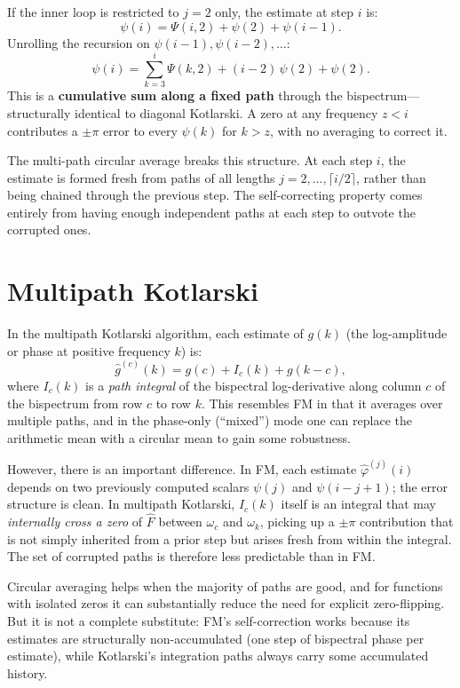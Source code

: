 \documentclass[11pt]{article}
\newcommand{\Fhat}{\hat{F}}
\begin{document}
If the inner loop is restricted to $j = 2$ only, the estimate at step
$i$ is:
\[
    \psi(i) = \Psi(i, 2) + \psi(2) + \psi(i-1).
\]
Unrolling the recursion on $\psi(i-1), \psi(i-2), \ldots$:
\[
    \psi(i) = \sum_{k=3}^{i} \Psi(k, 2) + (i-2)\,\psi(2) + \psi(2).
\]
This is a \textbf{cumulative sum along a fixed path} through the
bispectrum---structurally identical to diagonal Kotlarski.  A zero at
any frequency $z < i$ contributes a $\pm\pi$ error to every $\psi(k)$
for $k > z$, with no averaging to correct it.

The multi-path circular average breaks this structure.  At each step
$i$, the estimate is formed fresh from paths of all lengths $j =
2,\ldots,\lceil i/2\rceil$, rather than being chained through the
previous step.  The self-correcting property comes entirely from having
enough independent paths at each step to outvote the corrupted ones.

\section{Multipath Kotlarski}

In the multipath Kotlarski algorithm, each estimate of $g(k)$ (the
log-amplitude or phase at positive frequency $k$) is:
\[
    \widehat g^{(c)}(k) = g(c) + I_c(k) + g(k-c),
\]
where $I_c(k)$ is a \emph{path integral} of the bispectral
log-derivative along column $c$ of the bispectrum from row $c$ to row
$k$.  This resembles FM in that it averages over multiple paths, and
in the phase-only (``mixed'') mode one can replace the arithmetic mean
with a circular mean to gain some robustness.

However, there is an important difference.  In FM, each estimate
$\widehat\varphi^{(j)}(i)$ depends on two previously computed scalars
$\psi(j)$ and $\psi(i-j+1)$; the error structure is clean.  In
multipath Kotlarski, $I_c(k)$ itself is an integral that may
\emph{internally cross a zero} of $\Fhat$ between $\omega_c$ and
$\omega_k$, picking up a $\pm\pi$ contribution that is not simply
inherited from a prior step but arises fresh from within the integral.
The set of corrupted paths is therefore less predictable than in FM.

Circular averaging helps when the majority of paths are good, and for
functions with isolated zeros it can substantially reduce the need for
explicit zero-flipping.  But it is not a complete substitute: FM's
self-correction works because its estimates are structurally
non-accumulated (one step of bispectral phase per estimate), while
Kotlarski's integration paths always carry some accumulated history.
\end{document}
